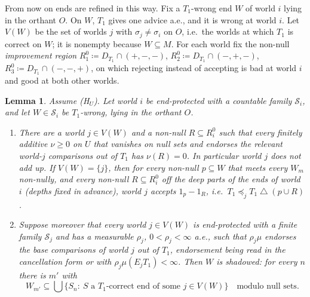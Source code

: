 \documentclass[11pt]{article}
\newtheorem{lemma}[theorem]{Lemma}
\theoremstyle{definition}
\theoremstyle{remark}
\newcommand{\sd}{\mathbin{\triangle}}
\begin{document}
From now on ends are refined in this way. Fix a $T_1$-wrong end $W$ of world $i$ lying in the orthant $O$. On $W$, $T_1$ gives one advice a.e., and it is wrong at world $i$. Let $V(W)$ be the set of worlds $j$ with $\sigma_j\ne\sigma_i$ on $O$, i.e.\ the worlds at which $T_1$ is correct on $W$; it is nonempty because $W\subseteq M$. For each world fix the non-null \emph{improvement region} $R^0_1\coloneqq D_{T_1}\cap(+,-,-)$, $R^0_2\coloneqq D_{T_1}\cap(-,+,-)$, $R^0_3\coloneqq D_{T_1}\cap(-,-,+)$, on which rejecting instead of accepting is bad at world $i$ and good at both other worlds.

\begin{lemma}\label{lem:H21}
Assume (H$_U$). Let world $i$ be end-protected with a countable family $\mathcal S_i$, and let $W\in\mathcal S_i$ be $T_1$-wrong, lying in the orthant $O$.
\begin{enumerate}[leftmargin=*,label=(\alph*)]
\item There are a world $j\in V(W)$ and a non-null $R\subseteq R^0_i$ such that every finitely additive $\nu\ge0$ on $U$ that vanishes on null sets and endorses the relevant world-$j$ comparisons out of $T_1$ has $\nu(R)=0$. In particular world $j$ does not add up. If $V(W)=\{j\}$, then for every non-null $p\subseteq W$ that meets every $W_m$ non-nully, and every non-null $R\subseteq R^0_i$ off the deep parts of the ends of world $i$ (depths fixed in advance), world $j$ accepts $1_p-1_R$, i.e.\ $T_1\preceq_jT_1\sd(p\cup R)$.
\item Suppose moreover that every world $j\in V(W)$ is end-protected with a finite family $\mathcal S_j$ and has a measurable $\rho_j$, $0<\rho_j<\infty$ a.e., such that $\rho_j\mu$ endorses the base comparisons of world $j$ out of $T_1$, endorsement being read in the cancellation form or with $\rho_j\mu(E_jT_1)<\infty$. Then $W$ is \emph{shadowed}: for every $n$ there is $m'$ with
\[
W_{m'}\subseteq\bigcup\{S_n:\ S\text{ a $T_1$-correct end of some }j\in V(W)\}\quad\text{modulo null sets.}
\]
\end{enumerate}
\end{lemma}
\end{document}
